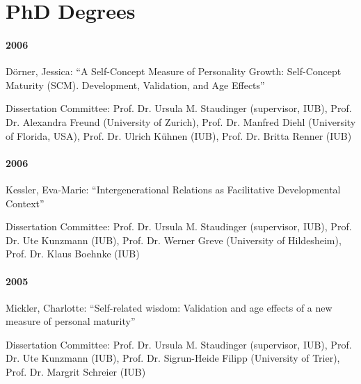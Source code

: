 \section{PhD Degrees}

\paragraph{2006} D\"orner, Jessica: ``A Self-Concept Measure of Personality Growth: Self-Concept Maturity (SCM). Development, Validation, and Age Effects''

Dissertation Committee: Prof. Dr. Ursula M. Staudinger (supervisor, IUB), Prof. Dr. Alexandra Freund (University of Zurich), Prof. Dr. Manfred Diehl (University of Florida, USA), Prof. Dr. Ulrich K\"uhnen (IUB), Prof. Dr. Britta Renner (IUB)

\paragraph{2006} Kessler, Eva-Marie: ``Intergenerational Relations as Facilitative Developmental Context'' 

Dissertation Committee: Prof. Dr. Ursula M. Staudinger (supervisor, IUB), Prof. Dr. Ute Kunzmann (IUB), Prof. Dr. Werner Greve (University of Hildesheim), Prof. Dr. Klaus Boehnke (IUB)

\paragraph{2005} Mickler, Charlotte: ``Self-related wisdom: Validation and age effects of a new measure of personal maturity'' 

Dissertation Committee: Prof. Dr. Ursula M. Staudinger (supervisor, IUB), Prof. Dr. Ute Kunzmann (IUB), Prof. Dr. Sigrun-Heide Filipp (University of Trier), Prof. Dr. Margrit Schreier (IUB)


